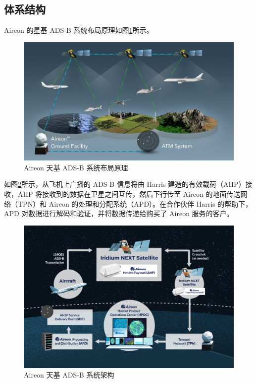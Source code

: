 \subsection{体系结构}

Aireon 的星基 ADS-B 系统布局原理如图\ref{fig:Aireon_GlobalSpaceBasedADSB_Coverage_Diagram}所示。

\begin{figure}[htbp]
\centering
\includegraphics[width=14cm]{pic/Aireon_GlobalSpaceBasedADSB_Coverage_Diagram-1024x576.jpg}
\caption{Aireon 天基 ADS-B 系统布局原理}
\label{fig:Aireon_GlobalSpaceBasedADSB_Coverage_Diagram}
\end{figure}

如图\ref{fig:System-Diagram-1024x693}所示，从飞机上广播的 ADS-B 信息将由 Harris 建造的有效载荷（AHP）接收，AHP 将接收到的数据在卫星之间互传，然后下行传至 Aireon 的地面传送网络（TPN）和 Aireon 的处理和分配系统（APD）。在合作伙伴 Harris 的帮助下，APD 对数据进行解码和验证，并将数据传递给购买了 Aireon 服务的客户。

\begin{figure}[htbp]
\centering
\includegraphics[width=13cm]{pic/System-Diagram-1024x693.jpg}
\caption{Aireon 天基 ADS-B 系统架构}
\label{fig:System-Diagram-1024x693}
\end{figure}

